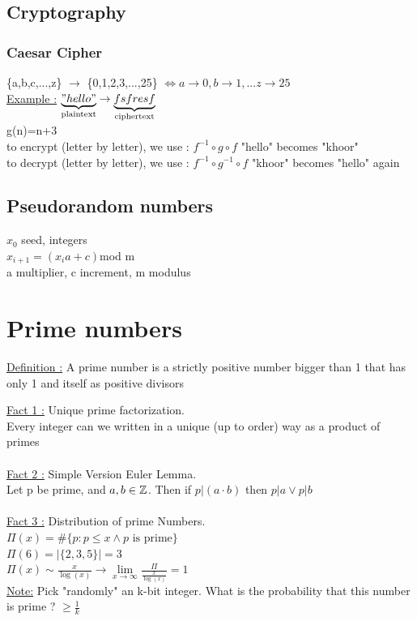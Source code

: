 \documentclass[12pt,a4paper]{article}
\begin{document}
\subsection{Cryptography}
\subsubsection*{Caesar Cipher}
\{a,b,c,...,z\} $\to$ \{0,1,2,3,...,25\} $\iff a \to 0, b \to 1,... z \to 25$\\
\underline{Example :} $\underbrace{"hello"}_{\text{plaintext}} \to \underbrace{fsfresf}_{\text{ciphertext}}$\\
g(n)=n+3\\
to encrypt (letter by letter), we use : $f^{-1}\circ g \circ f$ "hello" becomes "khoor"\\
to decrypt (letter by letter), we use : $f^{-1}\circ g^{-1} \circ f$ "khoor" becomes "hello" again

\subsection{Pseudorandom numbers}
$x_0$ seed, integers\\
$x_{i+1} = (x_ia+c)$mod m\\
a multiplier, c increment, m modulus


\section{Prime numbers}
\begin{boiteV}{0.9}
\underline{Definition :} A prime number is a strictly positive number bigger than 1 that has only 1 and itself as positive divisors
\end{boiteV}
\underline{Fact 1 :} Unique prime factorization.\\
Every integer can we written in a unique (up to order) way as a product of primes\\
\\
\underline{Fact 2 :} Simple Version Euler Lemma.\\
Let p be prime, and $a,b \in \mathbb{Z}$. Then if $p|(a\cdot b)$ then $p|a \vee p|b$\\
\\
\underline{Fact 3 :} Distribution of prime Numbers.\\
$\Pi(x) = \# \{p : p \leq x \wedge p \mbox{ is prime}\}$\\
$\Pi(6) = |\{2,3,5\}| = 3$\\
$\Pi(x) \sim \frac{x}{\log(x)} \to \lim\limits_{x \to \infty} \frac{\Pi}{\frac{x}{\log(x)}} = 1$\\
\underline{Note:} Pick "randomly" an k-bit integer. What is the probability that this number is prime ? $\geq \frac{1}{k}$
\end{document}
